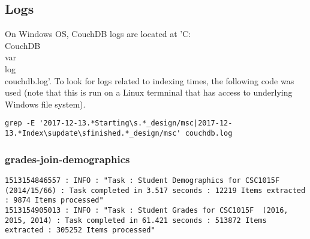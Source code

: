 \subsection{Logs}
\label{appendix:logs}
On Windows OS, CouchDB logs are located at 'C:\\CouchDB\\var\\log\\couchdb.log'. To look for logs related to indexing times, the following code was used (note that this is run on a Linux termninal that has access to underlying Windows file system).

\begin{verbatim}
grep -E '2017-12-13.*Starting\s.*_design/msc|2017-12-13.*Index\supdate\sfinished.*_design/msc' couchdb.log
\end{verbatim}


\subsubsection*{grades-join-demographics}

\begin{verbatim}
1513154846557 : INFO : "Task : Student Demographics for CSC1015F (2014/15/66) : Task completed in 3.517 seconds : 12219 Items extracted : 9874 Items processed"
1513154905013 : INFO : "Task : Student Grades for CSC1015F  (2016, 2015, 2014) : Task completed in 61.421 seconds : 513872 Items extracted : 305252 Items processed"
\end{verbatim}

